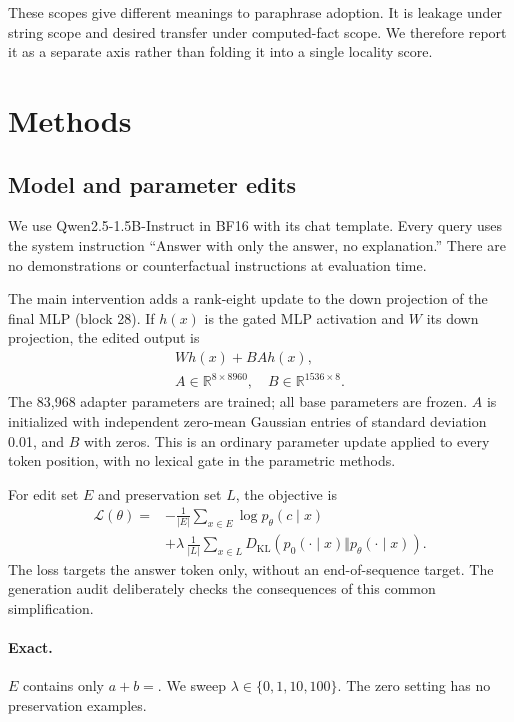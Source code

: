 \documentclass[10pt,twocolumn]{article}
\begin{document}
These scopes give different meanings to paraphrase adoption. It is leakage under string scope and desired transfer under computed-fact scope. We therefore report it as a separate axis rather than folding it into a single locality score.

\section{Methods}
\subsection{Model and parameter edits}
We use Qwen2.5-1.5B-Instruct \citep{qwen2024} in BF16 with its chat template. Every query uses the system instruction ``Answer with only the answer, no explanation.'' There are no demonstrations or counterfactual instructions at evaluation time.

The main intervention adds a rank-eight update to the down projection of the final MLP (block 28). If $h(x)$ is the gated MLP activation and $W$ its down projection, the edited output is
\begin{equation}
\begin{gathered}
Wh(x)+BAh(x),\\
A\in\mathbb{R}^{8\times8960},\quad B\in\mathbb{R}^{1536\times8}.
\end{gathered}
\end{equation}
The 83,968 adapter parameters are trained; all base parameters are frozen. $A$ is initialized with independent zero-mean Gaussian entries of standard deviation 0.01, and $B$ with zeros. This is an ordinary parameter update applied to every token position, with no lexical gate in the parametric methods.

For edit set $E$ and preservation set $L$, the objective is
\begin{align}
\mathcal{L}(\theta)={}&-\frac1{|E|}\sum_{x\in E}\log p_\theta(c\mid x)\\
&+\lambda\,\frac1{|L|}\sum_{x\in L}D_{\mathrm{KL}}\!\left(p_0(\cdot\mid x)\Vert p_\theta(\cdot\mid x)\right).\nonumber
\end{align}
The loss targets the answer token only, without an end-of-sequence target. The generation audit deliberately checks the consequences of this common simplification.

\paragraph{Exact.} $E$ contains only $a+b=$. We sweep $\lambda\in\{0,1,10,100\}$. The zero setting has no preservation examples.
\end{document}
